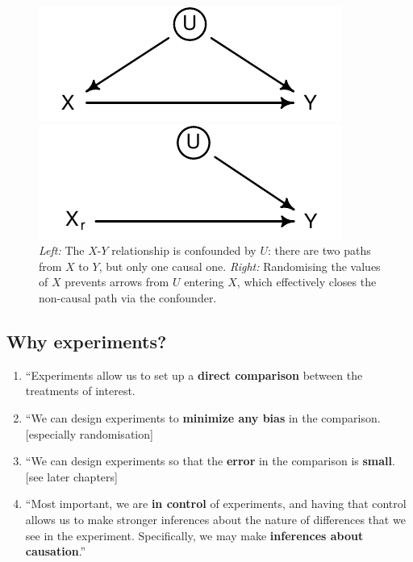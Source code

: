 \documentclass[a4paper]{tufte-book}\usepackage[]{graphicx}\usepackage[]{xcolor}
\begin{document}
\begin{figure}[tbp]
    \centering
    \begin{minipage}{0.45\textwidth}
        \centering
        \includegraphics[width=\textwidth]{figure/w_o_randomisation}
    \end{minipage}\hfill
    \begin{minipage}{0.45\textwidth}
        \centering
        \includegraphics[width=\textwidth]{figure/w_randomisation}
    \end{minipage}
    \caption{\textit{Left:} The $X$-$Y$ relationship is confounded by $U$: there are two paths from $X$ to $Y$, but only one causal one.
    \textit{Right:} Randomising the values of $X$ prevents arrows from $U$ entering $X$, which effectively closes the non-causal path
    via the confounder.}
    \label{fig:randomisation}
\end{figure}

\subsection{Why experiments?}
 \begin{enumerate}
  \item ``Experiments allow us to set up a \textbf{direct comparison} between the treatments of interest.
  \item ``We can design experiments to \textbf{minimize any bias} in the comparison. [especially randomisation]
  \item ``We can design experiments so that the \textbf{error} in the comparison is \textbf{small}. [see later chapters]
  \item ``Most important, we are \textbf{in control} of experiments, and having that control allows us to make stronger inferences about the nature of differences that we see in the experiment. Specifically, we may make \textbf{inferences about causation}.'' \citep[p.~2, my emphasis]{Oehlert2010}
 \end{enumerate}
\end{document}
